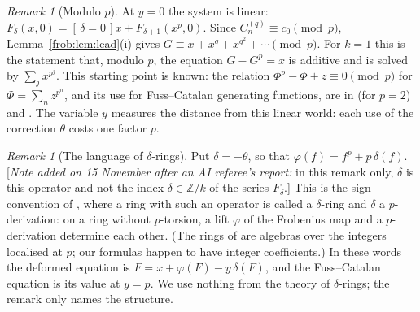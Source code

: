 \documentclass[11pt]{article}
\theoremstyle{definition}
\theoremstyle{remark}
\newtheorem{remark}[theorem]{Remark}
\numberwithin{equation}{section}
\numberwithin{figure}{section}
\newcommand{\Z}{\mathbb Z}
\newcommand{\C}{C_n^{(q)}}
\newcommand{\br}[1]{[\,#1\,]}
\newcommand{\refnote}[1]{[\emph{Note added on 15 November after an AI referee's report:} #1]}
\begin{document}
\begin{remark}[Modulo $p$]
At $y=0$ the system is linear: $F_\delta(x,0)=\br{\delta=0}x+F_{\delta+1}(x^p,0)$. Since
$\C\equiv c_0\pmod p$, Lemma~\ref{frob:lem:lead}(i) gives $G\equiv x+x^{q}+x^{q^2}+\cdots\pmod p$.
For $k=1$ this is the statement that, modulo $p$, the equation $G-G^p=x$ is additive and is
solved by $\sum_jx^{p^j}$. This starting point is known: the relation
$\Phi^p-\Phi+z\equiv0\pmod p$ for $\Phi=\sum_nz^{p^n}$, and its use for Fuss--Catalan
generating functions, are in \cite{KKM} (for $p=2$) and \cite{KM}. The variable $y$ measures
the distance from this linear world: each use of the correction $\theta$ costs one factor $p$.
\end{remark}

\begin{remark}[The language of $\delta$-rings]
Put $\delta=-\theta$, so that $\varphi(f)=f^p+p\,\delta(f)$.
\refnote{in this remark only, $\delta$ is this operator and not the index $\delta\in\Z/k$ of the series
$F_\delta$.}
This is the sign convention of
\cite[Definition~2.1 and Remark~2.2]{BhattScholze}, where a ring with such an operator is called a
$\delta$-ring and $\delta$ a $p$-derivation: on a ring without $p$-torsion, a lift $\varphi$
of the Frobenius map and a $p$-derivation determine each other. (The rings of \cite{BhattScholze} are
algebras over the integers localised at $p$; our formulas happen to have integer
coefficients.) In these words the deformed equation is
$F=x+\varphi(F)-y\,\delta(F)$, and the Fuss--Catalan equation is its value at $y=p$. We use
nothing from the theory of $\delta$-rings; the remark only names the structure.
\end{remark}
\end{document}
